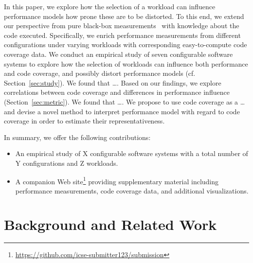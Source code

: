 {\color{blue}
In this paper, we explore how the selection of a workload can influence performance models how prone these are to be distorted. To this end, we extend our perspective from pure black-box measurements~\cite{dorn2020,siegmundPerformanceinfluenceModelsHighly2015,haDeepPerf2019,perfAL,guoVariabilityawarePerformancePrediction2013,sarkarCostEfficientSamplingPerformance,guo_2018_data,fourier_learning_2015,perLasso} with knowledge about the code executed. Specifically, we enrich performance measurements from different configurations under varying workloads with corresponding easy-to-compute code coverage data. 
We conduct an empirical study of seven configurable software systems to explore how the selection of workloads can influence both performance and code coverage, and possibly distort performance models (cf. Section~\ref{sec:study}). {\color{teal}We found that \ldots.} 
Based on our findings, we explore correlations between code coverage and differences in performance influence (Section~\ref{sec:metric}). 	We found that \ldots. We propose to use code coverage as a \ldots and devise a novel method to interpret performance model with regard to code coverage in order to estimate their representativeness.
}

In summary, we offer the following contributions:
\begin{itemize}

	\item An empirical study of X configurable software systems with a total number of Y configurations and Z workloads.
	\item A companion Web site\footnote{\url{https://github.com/icse-submitter123/submission}} providing supplementary material including performance measurements, code coverage data, and additional visualizations.
\end{itemize}

\section{Background and Related Work}
